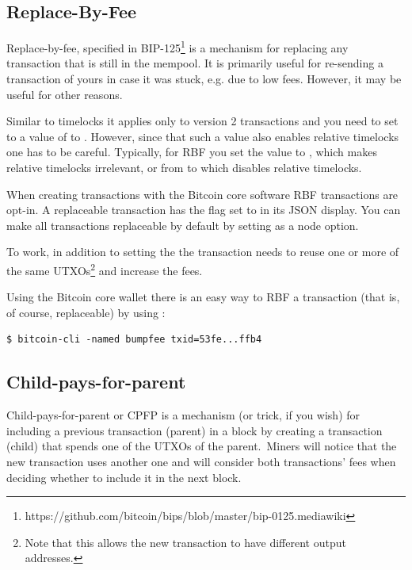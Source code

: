 \subsection*{Replace-By-Fee}
Replace-by-fee, specified in BIP-125\footnote{https://github.com/bitcoin/bips/blob/master/bip-0125.mediawiki} is a mechanism for replacing any transaction that is still in the mempool. It is primarily useful for re-sending a transaction of yours in case it was stuck, e.g. due to low fees. However, it may be useful for other reasons.

Similar to timelocks it applies only to version 2 transactions and you need to set  to a value of  to . However, since that such a value also enables relative timelocks one has to be careful. Typically, for RBF you set the  value to , which makes relative timelocks irrelevant, or from  to  which disables relative timelocks.

When creating transactions with the Bitcoin core software RBF transactions are opt-in. A replaceable transaction has the  flag set to  in its JSON display. You can make all transactions replaceable by default by setting  as a node option.

To work, in addition to setting the  the transaction needs to reuse one or more of the same UTXOs\footnote{Note that this allows the new transaction to have different output addresses.} and increase the fees.

Using the Bitcoin core wallet there is an easy way to RBF a transaction (that is, of course, replaceable) by using :

\begin{emphbox}
\begin{lstlisting}[style=Bash]
$ bitcoin-cli -named bumpfee txid=53fe...ffb4
\end{lstlisting}
\end{emphbox}


\subsection*{Child-pays-for-parent}
Child-pays-for-parent or CPFP is a mechanism (or trick, if you wish) for including a previous transaction (parent) in a block by creating a transaction (child) that spends one of the UTXOs of the parent. Miners will notice that the new transaction uses another one and will consider both transactions' fees when deciding whether to include it in the next block.

